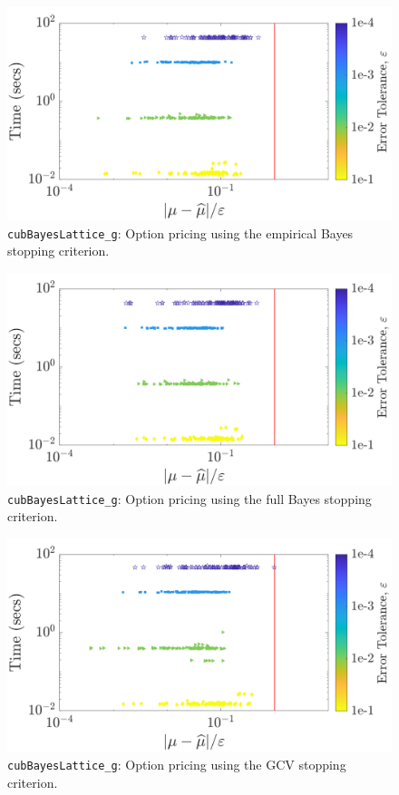\documentclass{iitthesis}          %
\newcommand{\code}[1]{\texttt{#1}}
\begin{document}
{{{{{{\label{sec:cubBayesLattice_option_pricing_example}
\begin{figure}
	\centering
	\includegraphics[width=0.95\linewidth]{"Lattice/Lattice_optPrice_guaranteed_time_MLE_Baker_d12_r1_2019-Jun-16"}
	\caption[Lattice: Option pricing Guaranteed: MLE]{\code{cubBayesLattice\_g}: Option pricing using the empirical Bayes stopping criterion.}
	\label{fig:optprice-guaranteed-MLE}
\end{figure}
\begin{figure}
	\centering
	\includegraphics[width=0.95\linewidth]{"Lattice/Lattice_optPrice_guaranteed_time_full_Baker_d12_r1_2019-Jun-16"}
	\caption[Lattice: OptPrice guaranteed: Full Bayes]{\code{cubBayesLattice\_g}: Option pricing using the full Bayes stopping criterion.}
	\label{fig:optprice-guaranteed-FB}
\end{figure}
\begin{figure}
	\centering
	\includegraphics[width=0.95\linewidth]{"Lattice/Lattice_optPrice_guaranteed_time_GCV_Baker_d12_r1_2019-Jun-16"}
	\caption[Lattice: OptPrice guaranteed: GCV]{\code{cubBayesLattice\_g}: Option pricing using the  GCV stopping criterion.} \label{fig:optprice-guaranteed-GCV}
\end{figure}


}}}}}}
\end{document}
